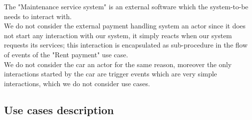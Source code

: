The "Maintenance service system" is an external software which the system-to-be needs to interact with. \\
 
We do not consider the external payment handling system an actor since it does not start any interaction with our system, it simply reacts when our system requests its services; this interaction is encapsulated as sub-procedure in the flow of events of the "Rent payment" use case.\\

We do not consider the car an actor for the same reason, moreover the only interactions started by the car are trigger events which are very simple interactions, which we do not consider use cases.\\
\clearpage
\subsection{Use cases description}

